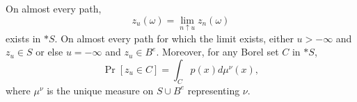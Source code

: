 On almost every path,
$$z_u(\omega) = \lim_{n \uparrow u} z_n(\omega)$$
exists in $*S$. On almost every path for which the limit exists, either $u > -\infty$ and $z_u \in S$ or else $u = -\infty$ and $z_u \in B^e$. Moreover, for any Borel set $C$ in $*S$,
$$\Pr[z_u \in C] = \int_C p(x) d\mu^\nu(x),$$
where $\mu^\nu$ is the unique measure on $S \cup B^e$ representing $\nu$.
